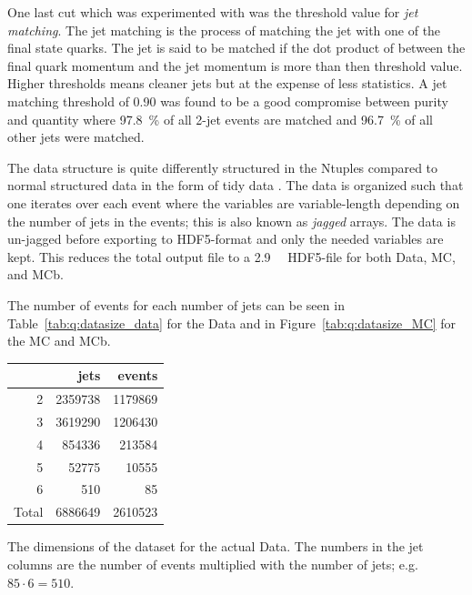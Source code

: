 One last cut which was experimented with was the threshold value for \emph{jet matching}. The jet matching is the process of matching the jet with one of the final state quarks. The jet is said to be matched if the dot product of between the final quark momentum and the jet momentum is more than then threshold value. Higher thresholds means cleaner jets but at the expense of less statistics. A jet matching threshold of \num{0.90} was found to be a good compromise between purity and quantity where \SI{97.8}{\percent} of all 2-jet events are matched and \SI{96.7}{\percent} of all other jets were matched.  

The data structure is quite differently structured in the Ntuples compared to normal structured data in the form of tidy data \autocite{JSSv059i10}. The data is organized such that one iterates over each event where the variables are variable-length depending on the number of jets in the events; this is also known as \emph{jagged} arrays. The data is un-jagged before exporting to HDF5-format and only the needed variables are kept. This reduces the total output file to a \SI{2.9}{\giga\byte} HDF5-file for both Data, MC, and MCb.

The number of events for each number of jets can be seen in Table~\ref{tab:q:datasize_data} for the Data and in Figure~\ref{tab:q:datasize_MC} for the MC and MCb. 

\begin{margintable}[1cm]
  \centering
  \begin{tabular}{@{}rrr@{}}
  {} &       jets &     events \\
  \midrule
  \num{2}     &  \num{2359738} &  \num{1179869} \\
  \num{3}     &  \num{3619290} &  \num{1206430} \\
  \num{4}     &   \num{854336} &   \num{213584} \\
  \num{5}     &    \num{52775} &    \num{10555} \\
  \num{6}     &      \num{510} &       \num{85} \\
  Total       &  \num{6886649} &  \num{2610523} \\  
  \end{tabular}
  \vspace{\abovecaptionskip}
  \caption[Dimensions of dataset for Data]{The dimensions of the dataset for the actual Data. The numbers in the jet columns are the number of events multiplied with the number of jets; e.g. $85 \cdot 6 = 510$.}
  \label{tab:q:datasize_data}
  \vspace{\abovecaptionskip}
\end{margintable}

